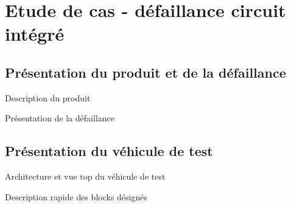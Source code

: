 \chapter{Etude de cas - défaillance circuit intégré}
\label{chap:3}
\section{Présentation du produit et de la défaillance}

Description du produit

Présentation de la défaillance

\section{Présentation du véhicule de test}

Architecture et vue top du véhicule de test

Description rapide des blocks désignés
